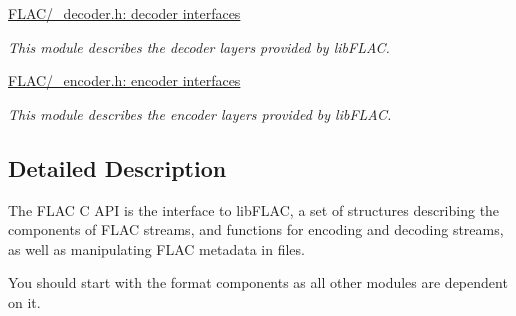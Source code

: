 \begin{DoxyCompactItemize}
\hyperlink{group__flac__decoder}{F\+L\+A\+C/\+\_\+decoder.\+h\+: decoder interfaces}
\begin{DoxyCompactList}\small\item\em This module describes the decoder layers provided by lib\+F\+L\+AC. \end{DoxyCompactList}\item 
\hyperlink{group__flac__encoder}{F\+L\+A\+C/\+\_\+encoder.\+h\+: encoder interfaces}
\begin{DoxyCompactList}\small\item\em This module describes the encoder layers provided by lib\+F\+L\+AC. \end{DoxyCompactList}\end{DoxyCompactItemize}


\subsection{Detailed Description}
The F\+L\+AC C A\+PI is the interface to lib\+F\+L\+AC, a set of structures describing the components of F\+L\+AC streams, and functions for encoding and decoding streams, as well as manipulating F\+L\+AC metadata in files.

You should start with the format components as all other modules are dependent on it. 